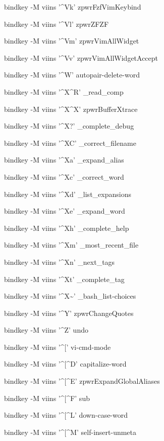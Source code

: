 \documentclass[11pt,a4paper,twoside]{book}
\begin{document}
bindkey -M viins '\textasciicircum{}Vk' zpwrFzfVimKeybind

bindkey -M viins '\textasciicircum{}Vl' zpwrZFZF

bindkey -M viins '\textasciicircum{}Vm' zpwrVimAllWidget

bindkey -M viins '\textasciicircum{}Vv' zpwrVimAllWidgetAccept

bindkey -M viins '\textasciicircum{}W' autopair-delete-word

bindkey -M viins '\textasciicircum{}X\textasciicircum{}R' \_read\_comp

bindkey -M viins '\textasciicircum{}X\textasciicircum{}X' zpwrBufferXtrace

bindkey -M viins '\textasciicircum{}X?' \_complete\_debug

bindkey -M viins '\textasciicircum{}XC' \_correct\_filename

bindkey -M viins '\textasciicircum{}Xa' \_expand\_alias

bindkey -M viins '\textasciicircum{}Xc' \_correct\_word

bindkey -M viins '\textasciicircum{}Xd' \_list\_expansions

bindkey -M viins '\textasciicircum{}Xe' \_expand\_word

bindkey -M viins '\textasciicircum{}Xh' \_complete\_help

bindkey -M viins '\textasciicircum{}Xm' \_most\_recent\_file

bindkey -M viins '\textasciicircum{}Xn' \_next\_tags

bindkey -M viins '\textasciicircum{}Xt' \_complete\_tag

bindkey -M viins '\textasciicircum{}X\textasciitilde{}' \_bash\_list-choices

bindkey -M viins '\textasciicircum{}Y' zpwrChangeQuotes

bindkey -M viins '\textasciicircum{}Z' undo

bindkey -M viins '\textasciicircum{}[' vi-cmd-mode

bindkey -M viins '\textasciicircum{}[\textasciicircum{}D' capitalize-word

bindkey -M viins '\textasciicircum{}[\textasciicircum{}E' zpwrExpandGlobalAliases

bindkey -M viins '\textasciicircum{}[\textasciicircum{}F' sub

bindkey -M viins '\textasciicircum{}[\textasciicircum{}L' down-case-word

bindkey -M viins '\textasciicircum{}[\textasciicircum{}M' self-insert-unmeta
\end{document}
